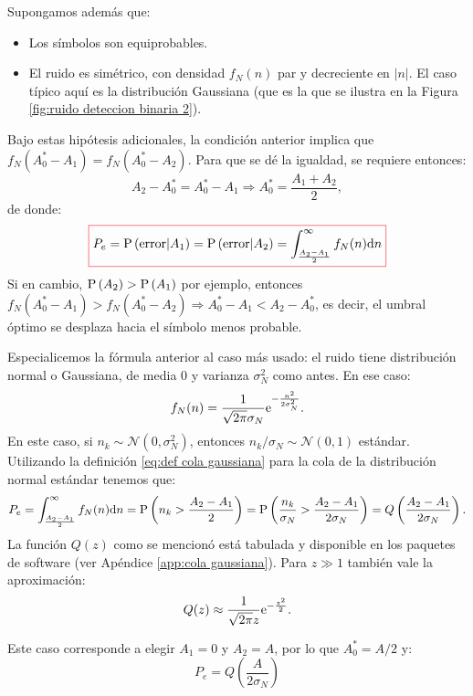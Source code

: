 Supongamos además que:
\begin{itemize}
    \item Los símbolos son equiprobables.
    \item El ruido es simétrico, con densidad $f_N(n)$ par y decreciente en $|n|$. El caso típico aquí es la distribución Gaussiana (que es la que se ilustra en la Figura \ref{fig:ruido deteccion binaria 2}).
\end{itemize}

Bajo estas hipótesis adicionales, la condición anterior implica que $f_N(A_0^*-A_1) = f_N(A_0^*-A_2)$. Para que se dé la igualdad, se requiere entonces:
\begin{equation*}
A_2-A_0^* = A_0^*-A_1 \Rightarrow A_0^*=\frac{A_1+A_2}{2},
\end{equation*}
de donde:
\begin{equation}
{\col{P_e= \p{\text{error}|A_1} = \p{\text{error}|A_2} = \int_{\frac{A_2-A_1}{2}}^\infty f_N(n)\d n}}
\end{equation}
Si en cambio, $\mathrm{P}\left(A_2\right) > \mathrm{P}\left(A_1\right)$ por ejemplo, entonces $f_N(A_0^*-A_1) > f_N(A_0^*-A_2) \Rightarrow A_0^*-A_1 < A_2-A_0^*$,  es decir, el umbral óptimo se desplaza hacia el símbolo menos probable.

Especialicemos la fórmula anterior al caso más usado: el ruido tiene distribución normal o Gaussiana, de media $0$ y varianza $\sigma_N^2$ como antes. En ese caso:
\begin{equation*}
f_N(n) = \frac{1}{\sqrt{2\pi}\sigma_N}\mathrm{e}^{-\frac{n^2}{2\sigma_N^2}}.
\end{equation*}
En este caso, si $n_k\sim \mathcal{N}(0,\sigma_N^2)$, entonces $n_k/\sigma_N \sim \mathcal{N}(0,1)$ estándar. Utilizando la definición \eqref{eq:def cola gaussiana} para la cola de la distribución normal estándar tenemos que:
\begin{equation}\label{eq:error binario gaussiano}
P_e=\int_{\frac{A_2-A_1}{2}}^\infty f_N(n)\mathrm{d} n = \mathrm{P}\left(n_k>\frac{A_2-A_1}{2}\right) = \mathrm{P}\left(\frac{n_k}{\sigma_N}>\frac{A_2-A_1}{2\sigma_N}\right) = Q\left(\frac{A_2-A_1}{2\sigma_N}\right).    
\end{equation}
La función $Q(z)$ como se mencionó está tabulada y disponible en los paquetes de software (ver Apéndice \ref{app:cola gaussiana}). Para $z\gg 1$ también vale la aproximación:
\begin{equation*}
    Q(z) \approx \frac{1}{\sqrt{2\pi}z}\mathrm{e}^{-\frac{z^2}{2}}.
\end{equation*}

\begin{ejemplo}
Este caso corresponde a elegir $A_1=0$ y $A_2=A$, por lo que $A_0^* = A/2$ y:
\begin{equation*}
    P_e = Q\left(\frac{A}{2\sigma_N}\right)
\end{equation*}
\end{ejemplo}

